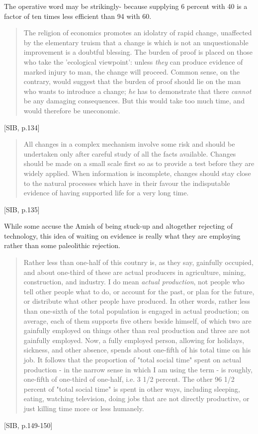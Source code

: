 \documentclass[letterpaper]{article}
\begin{document}
The operative word may be strikingly- because supplying 6 percent with 40 is a factor of ten times less efficient than 94 with 60.

\begin{quote}
  The religion of economics promotes an idolatry of rapid change, unaffected by the elementary truism that a change is which is not an unquestionable improvement is a doubtful blessing. The burden of proof is placed on those who take the 'ecological viewpoint': unless \textit{they} can produce evidence of marked injury to man, the change will proceed. Common sense, on the contrary, would suggest that the burden of proof should lie on the man who wants to introduce a change; \textit{he} has to demonstrate that there \textit{cannot} be any damaging consequences. But this would take too much time, and would therefore be uneconomic.
\end{quote}[SIB, p.134]

\begin{quote}
  All changes in a complex mechanism involve some risk and should be undertaken only after careful study of all the facts available. Changes should be made on a small scale first so as to provide a test before they are widely applied. When information is incomplete, changes should stay close to the natural processes which have in their favour the indisputable evidence of having supported life for a very long time.
\end{quote}[SIB, p.135]

While some accuse the Amish of being stuck-up and altogether rejecting of technology, this idea of waiting on evidence is really what they are employing rather than some paleolithic rejection.

\begin{quote}
  Rather less than one-half of this coutnry is, as they say, gainfully occupied, and about one-third of these are actual producers in agriculture, mining, construction, and industry. I do mean \textit{actual production}, not people who tell other people what to do, or account for the past, or plan for the future, or distribute what other people have produced. In other words, rather less than one-sixth of the total population is engaged in actual production; on average, each of them supports five others beside himself, of which two are gainfully employed on things other than real production and three are not gainfully employed. Now, a fully employed person, allowing for holidays, sickness, and other absence, spends about one-fifth of his total time on his job. It follows that the proportion of "total social time" spent on actual production - in the narrow sense in which I am using the term - is roughly, one-fifth of one-third of one-half, i.e. 3 1/2 percent. The other 96 1/2 percent of "total social time" is spent in other ways, including sleeping, eating, watching television, doing jobs that are not directly productive, or just killing time more or less humanely.
\end{quote} [SIB, p.149-150]
\end{document}
